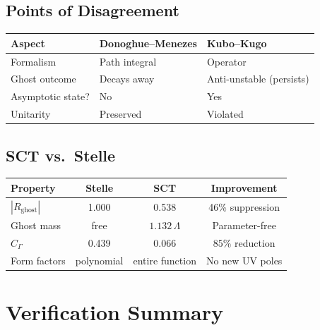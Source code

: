 \documentclass[11pt,a4paper]{article}
\begin{document}
\subsection{Points of Disagreement}

\begin{center}
\begin{tabular}{lll}
\toprule
Aspect & Donoghue--Menezes & Kubo--Kugo \\
\midrule
Formalism & Path integral & Operator \\
Ghost outcome & Decays away & Anti-unstable (persists) \\
Asymptotic state? & No & Yes \\
Unitarity & Preserved & Violated \\
\bottomrule
\end{tabular}
\end{center}

\subsection{SCT vs.\ Stelle}

\begin{center}
\begin{tabular}{lccc}
\toprule
Property & Stelle & SCT & Improvement \\
\midrule
$|R_{\mathrm{ghost}}|$ & 1.000 & 0.538 & 46\% suppression \\
Ghost mass & free & $1.132\,\Lambda$ & Parameter-free \\
$C_\Gamma$ & 0.439 & 0.066 & $85\%$ reduction \\
Form factors & polynomial & entire function & No new UV poles \\
\bottomrule
\end{tabular}
\end{center}


\section{Verification Summary}
\label{sec:verification}
\end{document}
